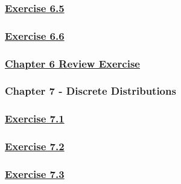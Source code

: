 \documentclass[
  11pt,
]{book}
\begin{document}
\subsubsection*{\texorpdfstring{\hyperref[ex65q]{Exercise 6.5}}{Exercise 6.5}}\label{exercise-6.5-1}

\subsubsection*{\texorpdfstring{\hyperref[ex66q]{Exercise 6.6}}{Exercise 6.6}}\label{exercise-6.6-1}

\subsubsection*{\texorpdfstring{\hyperref[re6q]{Chapter 6 Review Exercise}}{Chapter 6 Review Exercise}}\label{chapter-6-review-exercise}

\subsubsection*{Chapter 7 - Discrete Distributions}\label{chapter-7---discrete-distributions}

\subsubsection*{\texorpdfstring{\hyperref[ex71q]{Exercise 7.1}}{Exercise 7.1}}\label{exercise-7.1-1}

\subsubsection*{\texorpdfstring{\hyperref[ex72q]{Exercise 7.2}}{Exercise 7.2}}\label{exercise-7.2-1}

\subsubsection*{\texorpdfstring{\hyperref[ex73q]{Exercise 7.3}}{Exercise 7.3}}\label{exercise-7.3-1}
\end{document}

